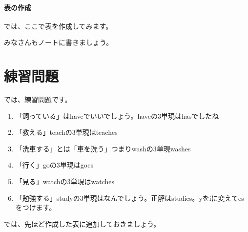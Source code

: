 \documentclass[book,jafontscale=0.9247]{jlreq}
\newcommand{\mySagyo}{%
\begin{minipage}[t]{.98\textwidth}
\mbox{}\hrulefill\mbox{}\par%
\mbox{}\hfill{}\raisebox{-5pt}{作業}\hfill\mbox{}\par%
\mbox{}\hrulefill\mbox{}
\end{minipage}%
\par%
\bigskip
}
\begin{document}
\paragraph{表の作成}

では、ここで表を作成してみます。

みなさんもノートに書きましょう。



\section{練習問題}

では、練習問題です。

\mySagyo

\begin{enumerate}
 \item 「飼っている」はhaveでいいでしょう。haveの3単現はhasでしたね
 \item 「教える」teachの3単現はteaches
 \item 「洗車する」とは「車を洗う」つまりwashの3単現washes
 \item 「行く」goの3単現はgoes
 \item 「見る」watchの3単現はwatches
 \item 「勉強する」studyの3単現はなんでしょう。正解はstudies。yをiに変えてesをつけます。
\end{enumerate}

では、先ほど作成した表に追加しておきましょう。
\end{document}
